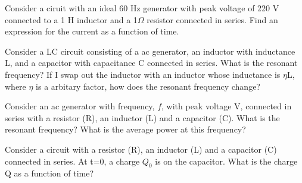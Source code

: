 \documentclass[12pt]{article}
\begin{document}
\pagestyle{empty}

\noindent Consider a ciruit with an ideal 60 Hz generator with peak voltage of 220 V connected to a 1 H inductor and a 1$\Omega$ resistor connected in series.  Find an expression for the current as a function of time.

\newpage

\noindent Consider a LC circuit consisting of a ac generator, an inductor with inductance L, and a capacitor with capacitance C connected in series.  What is the resonant frequency? If I swap out the inductor with an inductor whose inductance is $\eta$L, where $\eta$ is a arbitary factor, how does the resonant frequency change?

\newpage

\noindent Consider an ac generator with frequency, $f$, with peak voltage V, connected in series with a resistor (R), an inductor (L) and a capacitor (C).  What is the resonant frequency? What is the average power at this frequency? 

\newpage

\noindent Consider a circuit with a resistor (R), an inductor (L) and a capacitor (C) connected in series.  At t=0, a charge $Q_0$ is on the capacitor.  What is the charge Q as a function of time?
\end{document}
